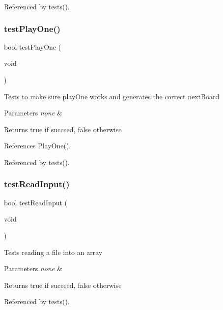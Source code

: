 Referenced by tests().

\mbox{\label{tests_8c_aa4c8095a20d90a18d843ab63ecd02d00}} 
\subsubsection{test\+Play\+One()}
{\footnotesize\ttfamily bool test\+Play\+One (\begin{DoxyParamCaption}\item[{void}]{ }\end{DoxyParamCaption})}

Tests to make sure play\+One works and generates the correct next\+Board 
\begin{DoxyParams}{Parameters}
{\em none} & \\
\hline
\end{DoxyParams}
\begin{DoxyReturn}{Returns}
true if succeed, false otherwise 
\end{DoxyReturn}


References Play\+One().



Referenced by tests().

\mbox{\label{tests_8c_aa89f64db87aebe77bd891e2894595e4e}} 
\subsubsection{test\+Read\+Input()}
{\footnotesize\ttfamily bool test\+Read\+Input (\begin{DoxyParamCaption}\item[{void}]{ }\end{DoxyParamCaption})}

Tests reading a file into an array 
\begin{DoxyParams}{Parameters}
{\em none} & \\
\hline
\end{DoxyParams}
\begin{DoxyReturn}{Returns}
true if succeed, false otherwise 
\end{DoxyReturn}


Referenced by tests().

\mbox{\label{tests_8c_a5e6e6e78df62797046c9ea173550a68a}} 
